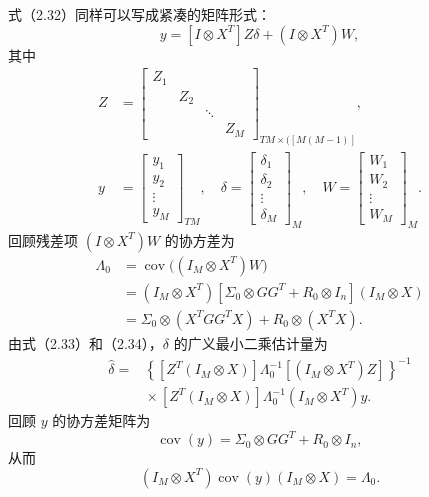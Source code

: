 式（2.32）同样可以写成紧凑的矩阵形式：
\begin{equation}
[I\otimes X^T]y=[I\otimes X^T]Z\delta+(I\otimes X^T)W,
\tag{2.33}
\end{equation}
其中
\[
\begin{aligned}
Z&=\begin{bmatrix}Z_1&&&\\&Z_2&&\\&&\ddots&\\&&&Z_M\end{bmatrix}_{TM\times([M(M-1)]},\\
y&=\begin{bmatrix}y_1\\y_2\\\vdots\\y_M\end{bmatrix}_{TM},
\quad
\delta=\begin{bmatrix}\delta_1\\\delta_2\\\vdots\\\delta_M\end{bmatrix}_M,
\quad
W=\begin{bmatrix}W_1\\W_2\\\vdots\\W_M\end{bmatrix}_M.
\end{aligned}
\]
回顾残差项 $(I\otimes X^T)W$ 的协方差为
\begin{equation}
\begin{aligned}
\Lambda_0&=\operatorname{cov}\bigl((I_M\otimes X^T)W\bigr)\\
&=(I_M\otimes X^T)[\Sigma_0\otimes GG^T+R_0\otimes I_n](I_M\otimes X)\\
&=\Sigma_0\otimes(X^TGG^TX)+R_0\otimes(X^TX).
\end{aligned}\tag{2.34}
\end{equation}
由式（2.33）和（2.34），$\delta$ 的广义最小二乘估计量为
\begin{equation}
\begin{aligned}
\widehat\delta={}&
\left\{[Z^T(I_M\otimes X)]\Lambda_0^{-1}[(I_M\otimes X^T)Z]\right\}^{-1}\\
&{}\times[Z^T(I_M\otimes X)]\Lambda_0^{-1}(I_M\otimes X^T)y.
\end{aligned}\tag{2.35}
\end{equation}
回顾 $y$ 的协方差矩阵为
\[
\operatorname{cov}(y)=\Sigma_0\otimes GG^T+R_0\otimes I_n,
\]
从而
\begin{equation}
(I_M\otimes X^T)\operatorname{cov}(y)(I_M\otimes X)=\Lambda_0.
\tag{2.36}
\end{equation}
